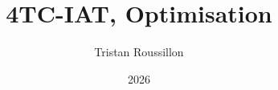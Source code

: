 \documentclass{beamer}
\title[]
 {4TC-IAT, Optimisation}
\author[T. Roussillon]
 {Tristan Roussillon}
\date{2026}
\institute{INSA Lyon, TC}
\begin{document}
\begin{frame}
  \titlepage
\end{frame}










\end{document}
